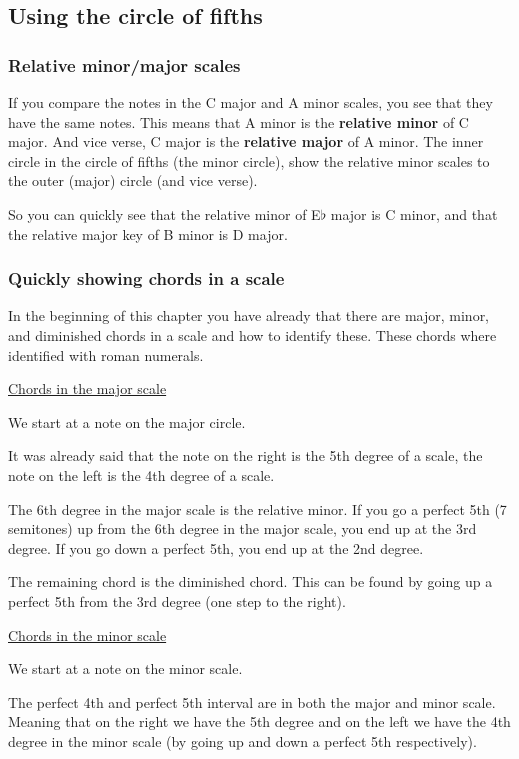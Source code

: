 \newpage

\subsection{Using the circle of fifths}

\subsubsection{Relative minor/major scales}

If you compare the notes in the C major and A minor scales, you see that they have the same notes. This means that A minor is the \textbf{relative minor} of C major. And vice verse, C major is the \textbf{relative major} of A minor. The inner circle in the circle of fifths (the minor circle), show the relative minor scales to the outer (major) circle (and vice verse).

So you can quickly see that the relative minor of E$\flat$ major is C minor, and that the relative major key of B minor is D major.

\subsubsection{Quickly showing chords in a scale}

In the beginning of this chapter you have already that there are major, minor, and diminished chords in a scale and how to identify these. These chords where identified with roman numerals.

\underline{Chords in the major scale}

We start at a note on the major circle.

It was already said that the note on the right is the 5th degree of a scale, the note on the left is the 4th degree of a scale.

The 6th degree in the major scale is the relative minor. If you go a perfect 5th (7 semitones) up from the 6th degree in the major scale, you end up at the 3rd degree. If you go down a perfect 5th, you end up at the 2nd degree.

The remaining chord is the diminished chord. This can be found by going up a perfect 5th from the 3rd degree (one step to the right).

\underline{Chords in the minor scale}

We start at a note on the minor scale.

The perfect 4th and perfect 5th interval are in both the major and minor scale. Meaning that on the right we have the 5th degree and on the left we have the 4th degree in the minor scale (by going up and down a perfect 5th respectively).

